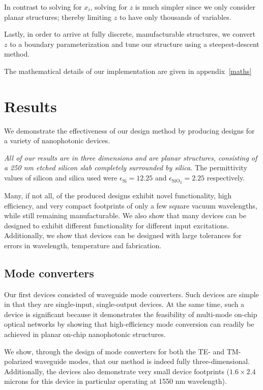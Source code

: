 In contrast to solving for $x_i$, solving for $z$ is much simpler since we
    only consider planar structures;
    thereby limiting $z$ to have only thousands of variables.

Lastly, in order to arrive at fully discrete, manufacturable structures,
    we convert $z$ to a boundary parameterization\cite{Osher02}
    and tune our structure using a steepest-descent method.

The mathematical details of our implementation are given 
    in appendix~\ref{maths}

\section{Results}
We demonstrate the effectiveness of our design method 
    by producing designs for a variety of nanophotonic devices\cite{Lu13}.

\emph{All of our results are in three dimensions
    and are planar structures, consisting of a 250 nm etched silicon slab
    completely surrounded by silica.}
The permittivity values of silicon and silica used
    were $\epsilon_\text{Si} = 12.25$ and $\epsilon_\text{SiO$_2$} = 2.25$
    respectively.

Many, if not all, of the produced designs exhibit 
    novel functionality, high efficiency, and 
    very compact footprints of only a few square vacuum wavelengths,
    while still remaining manufacturable.
We also show that many devices can be designed
    to exhibit different functionality for different input excitations.
Additionally, we show that devices can be designed with large tolerances for
    errors in wavelength, temperature and fabrication.

\subsection{Mode converters}

Our first devices consisted of waveguide mode converters.
Such devices are simple in that they are single-input, single-output devices.
At the same time, such a device is significant because 
    it demonstrates the feasibility of multi-mode on-chip optical networks
    by showing that high-efficiency mode conversion 
    can readily be achieved in planar on-chip nanophotonic structures.

We show, through the design of mode converters for both the TE- and TM-polarized
    waveguide modes, 
    that our method is indeed fully three-dimensional.
Additionally, the devices also demonstrate very small device footprints 
    ($1.6 \times 2.4$ microns for this device in particular
    operating at 1550 nm wavelength).

